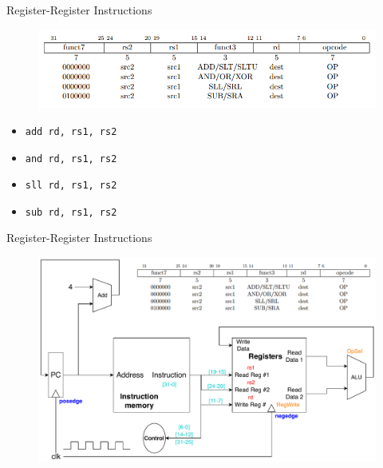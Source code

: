 \documentclass[UTF8]{ctexbeamer}
\begin{document}
\begin{frame}[fragile]{Register-Register Instructions}
\begin{figure}
\centering
\includegraphics[width=\linewidth]{fig/Lecture2/r-r.PNG}
\end{figure}
\begin{itemize}
	\item \verb'add rd, rs1, rs2'
	\item \verb'and rd, rs1, rs2'
	\item \verb'sll rd, rs1, rs2'
	\item \verb'sub rd, rs1, rs2'
\end{itemize}
\end{frame}

\begin{frame}{Register-Register Instructions}
\begin{figure}
\centering
\includegraphics[width=\linewidth]{fig/Lecture2/Datapath-R-R.pdf}
\end{figure}
\end{frame}
\end{document}
